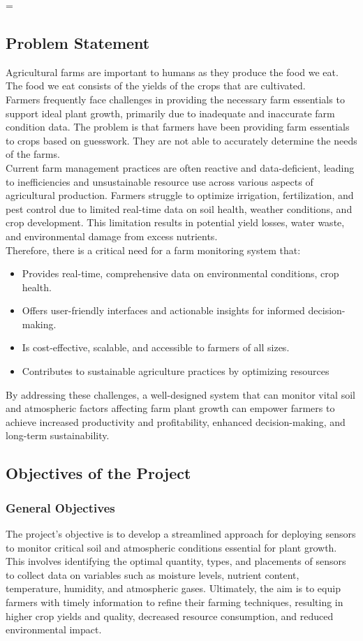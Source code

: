 =\documentclass[12pt, a4paper]{article}
\begin{document}
\subsection{Problem Statement}
Agricultural farms are important to humans as they produce the food we eat. The food we eat consists of the yields of the crops that are cultivated.\\ 
Farmers frequently face challenges in providing the necessary farm essentials to support ideal plant growth, primarily due to inadequate and inaccurate farm condition data. The problem is that farmers have been providing farm essentials to crops based on guesswork. They are not able to accurately determine the needs of the farms.
\\
Current farm management practices are often reactive and data-deficient, leading to inefficiencies and unsustainable resource use across various aspects of agricultural production. Farmers struggle to optimize irrigation, fertilization, and pest control due to limited real-time data on soil health, weather conditions, and crop development. This limitation results in potential yield losses, water waste, and environmental damage from excess nutrients.
\\
Therefore, there is a critical need for a farm monitoring system that:
\begin{itemize}
 \item Provides real-time, comprehensive data on environmental conditions, crop health.
 \item Offers user-friendly interfaces and actionable insights for informed decision-making.
 \item Is cost-effective, scalable, and accessible to farmers of all sizes.
 \item Contributes to sustainable agriculture practices by optimizing resources
\end{itemize}
By addressing these challenges, a well-designed system that can monitor vital soil and atmospheric factors affecting farm plant growth can empower farmers to achieve increased productivity and profitability, enhanced decision-making, and long-term sustainability.



\newpage
\subsection{Objectives of the Project}
\subsubsection{General Objectives}
The project's objective is to develop a streamlined approach for deploying sensors to monitor critical soil and atmospheric conditions essential for plant growth. This involves identifying the optimal quantity, types, and placements of sensors to collect data on variables such as moisture levels, nutrient content, temperature, humidity, and atmospheric gases. Ultimately, the aim is to equip farmers with timely information to refine their farming techniques, resulting in higher crop yields and quality, decreased resource consumption, and reduced environmental impact.
\end{document}

